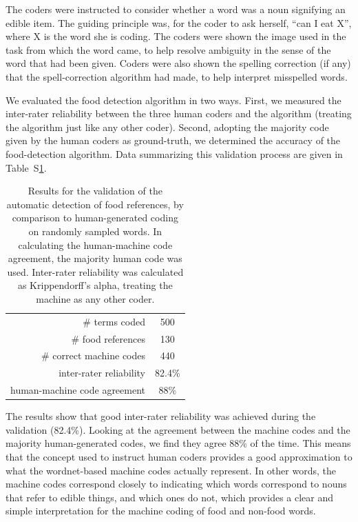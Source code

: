 \documentclass[12pt]{article}
\begin{document}
The coders were instructed to consider whether a word was a noun signifying
an edible item.  The guiding principle was, for the coder to ask herself,
``can I eat X'', where X is the word she is coding.  The coders were
shown the image used in the task from which the word came, to help resolve ambiguity
in the sense of the word that had been given.  Coders were also shown the 
spelling correction (if any) that the spell-correction algorithm had made,
to help interpret misspelled words.

We evaluated the food detection algorithm in two ways.  First, we measured
the inter-rater reliability between the three human coders and the algorithm
(treating the algorithm just like any other coder).  Second, adopting the 
majority code given by the human coders as ground-truth, we determined the 
accuracy of the food-detection algorithm.  
Data summarizing this validation process are given
in Table~S\ref{table:inter-rater}.

\begin{table}
\centering
\setlength{\tabcolsep}{12pt}
\begin{tabular}{ r | c }
\toprule    
\# terms coded & 500 \\
\# food references & 130 \\
\# correct machine codes & 440 \\
inter-rater reliability & 82.4\% \\
human-machine code agreement & 88\% \\
\bottomrule
\end{tabular}
\caption{
	Results for the validation 
	of the automatic detection of food references, by comparison to
	human-generated coding on randomly sampled words.  In calculating the 
	human-machine code agreement, the majority human code was used.
	Inter-rater reliability was calculated as Krippendorff's alpha, treating
	the machine as any other coder.
}
\label{table:inter-rater}
\end{table}

The results show that good inter-rater reliability was achieved during the
validation (82.4\%).  Looking at the agreement between the 
machine codes and the majority human-generated codes, we find they agree
88\% of the time.  This means that the concept used to instruct human coders
provides a good approximation to what the wordnet-based machine codes actually
represent. In other words, the machine codes correspond closely to indicating
which words correspond to nouns that refer to edible things, and which ones
do not, which provides a clear and simple interpretation for the machine
coding of food and non-food words.
\end{document}
